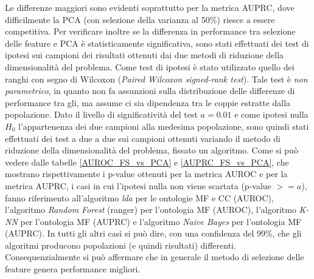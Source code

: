 \documentclass[12pt]{report}
\begin{document}
Le differenze maggiori sono evidenti soprattutto per la metrica AUPRC, dove difficilmente la PCA (con selezione della varianza al 50\%) riesce a essere competitiva. 
\newline
\newline
Per verificare inoltre se la differenza in performance tra selezione delle feature e PCA è statisticamente significativa, sono stati effettuati dei test di ipotesi sui campioni dei risultati ottenuti dai due metodi di riduzione della dimensionalità del problema.
\newline
\newline
Come test di ipotesi è stato utilizzato quello dei ranghi con segno di Wilcoxon\cite{wilcoxon} (\emph{Paired Wilcoxon signed-rank test}). Tale test è \emph{non parametrico}, in quanto non fa assunzioni sulla distribuzione delle differenze di performance tra gli, ma assume ci sia dipendenza tra le coppie estratte dalla popolazione.
\newline
\newline
Dato il livello di significatività del test $a=0.01$ e come ipotesi nulla $H_0$ l'appartenenza dei due campioni alla medesima popolazione, sono quindi stati effettuati dei test a due a due sui campioni ottenuti variando il metodo di riduzione della dimensionalità del problema, fissato un algoritmo. Come si può vedere dalle tabelle \ref{AUROC_FS_vs_PCA} e \ref{AUPRC_FS_vs_PCA}, che mostrano rispettivamente i p-value ottenuti per la metrica AUROC e per la metrica AUPRC, i casi in cui l'ipotesi nulla non viene scartata (p-value $>= a$), fanno riferimento all'algoritmo \emph{lda} per le ontologie MF e CC (AUROC), l'algoritmo \emph{Random Forest} (ranger) per l'ontologia  MF (AUROC), l'algoritmo \emph{K-NN} per l'ontologia MF (AUPRC) e l'algoritmo \emph{Naive Bayes} per l'ontologia MF (AUPRC). In tutti gli altri casi si può dire, con una confidenza del 99\%, che gli algoritmi producono popolazioni (e quindi risultati) differenti. Consequenzialmente si può affermare che in generale il metodo di selezione delle feature genera performance migliori.
\end{document}
